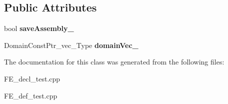 \subsection*{Public Attributes}
\begin{DoxyCompactItemize}
\item 
\mbox{\label{classFEDD_1_1FE_a986e54e83eac0f5814f8912c95d2a640}} 
bool {\bfseries save\+Assembly\+\_\+}
\item 
\mbox{\label{classFEDD_1_1FE_a64d68016df55be91fcbf3e156062ac66}} 
Domain\+Const\+Ptr\+\_\+vec\+\_\+\+Type {\bfseries domain\+Vec\+\_\+}
\end{DoxyCompactItemize}


The documentation for this class was generated from the following files\+:\begin{DoxyCompactItemize}
\item 
F\+E\+\_\+decl\+\_\+test.\+cpp\item 
F\+E\+\_\+def\+\_\+test.\+cpp\end{DoxyCompactItemize}
